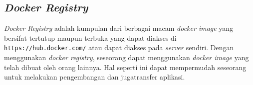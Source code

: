 	\subsection{\textit{Docker Registry}}
	\textit{Docker Registry} adalah kumpulan dari berbagai macam \textit{docker image} yang bersifat tertutup maupun terbuka yang dapat diakses di \texttt{https://hub.docker.com/} atau dapat diakses pada \textit{server} sendiri. Dengan menggunakan \textit{docker registry}, seseorang dapat menggunakan \textit{docker image} yang telah dibuat oleh orang lainnya. Hal seperti ini dapat mempermudah seseorang untuk melakukan pengembangan dan jugatransfer aplikasi.
	